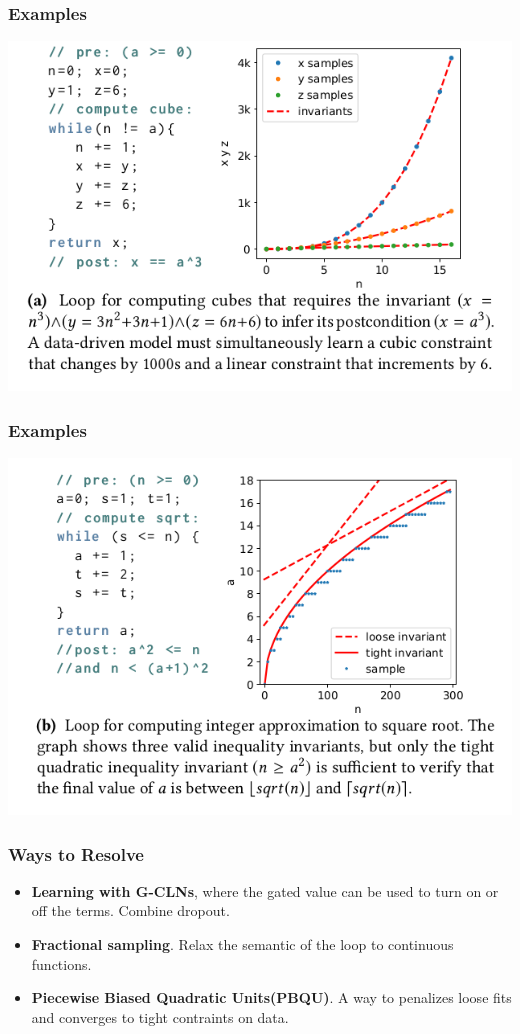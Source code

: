 \documentclass[11pt]{beamer}
\begin{document}
\begin{frame}\frametitle{Examples}
\begin{center}
\includegraphics[scale=0.4]{exp1.png}
\end{center}
\end{frame}

\begin{frame}\frametitle{Examples}
\begin{center}

\includegraphics[scale=0.4]{exp2.png}
\end{center}
\end{frame}


\begin{frame}\frametitle{Ways to Resolve}
\begin{itemize}

\item \textbf{Learning with G-CLNs}, where the gated value can be used to turn on or off the terms. Combine dropout.

\item \textbf{Fractional sampling}. Relax the semantic of the loop to continuous functions.

\item \textbf{Piecewise Biased Quadratic Units(PBQU)}. A way to penalizes loose fits and converges to tight contraints on data.

\end{itemize}
\end{frame}
\end{document}
